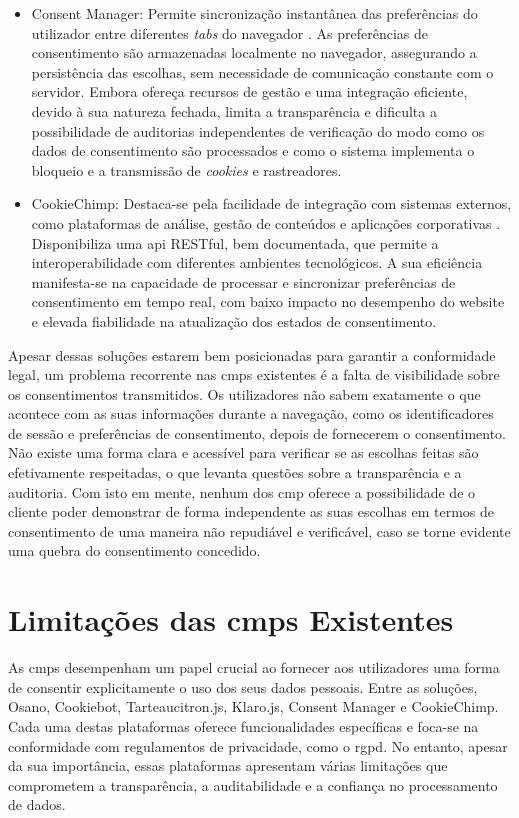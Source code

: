\begin{itemize}
    \item Consent Manager: Permite sincronização instantânea das preferências do utilizador entre diferentes \textit{tabs} do navegador \cite{ConsentManager2024}. As preferências de consentimento são armazenadas localmente no navegador, assegurando a persistência das escolhas, sem necessidade de comunicação constante com o servidor. Embora ofereça recursos de gestão e uma integração eficiente, devido à sua natureza fechada, limita a transparência e dificulta a possibilidade de auditorias independentes de verificação do modo como os dados de consentimento são processados e como o sistema implementa o bloqueio e a transmissão de \textit{cookies} e rastreadores.

    \item CookieChimp: Destaca-se pela facilidade de integração com sistemas externos, como plataformas de análise, gestão de conteúdos e aplicações corporativas \cite{CookieChimp2024}. Disponibiliza uma \acrshort{api} RESTful, bem documentada, que permite a interoperabilidade com diferentes ambientes tecnológicos. A sua eficiência manifesta-se na capacidade de processar e sincronizar preferências de consentimento em tempo real, com baixo impacto no desempenho do website e elevada fiabilidade na atualização dos estados de consentimento.
\end{itemize}

Apesar dessas soluções estarem bem posicionadas para garantir a conformidade legal, um problema recorrente nas \acrshort{cmp}s existentes é a falta de visibilidade sobre os consentimentos transmitidos. Os utilizadores não sabem exatamente o que acontece com as suas informações durante a navegação, como os identificadores de sessão e preferências de consentimento, depois de fornecerem o consentimento. Não existe uma forma clara e acessível para verificar se as escolhas feitas são efetivamente respeitadas, o que levanta questões sobre a transparência e a auditoria. Com isto em mente, nenhum dos \acrshort{cmp} oferece a possibilidade de o cliente poder demonstrar de forma independente as suas escolhas em termos de consentimento de uma maneira não repudiável e verificável, caso se torne evidente uma quebra do consentimento concedido.


\section{Limitações das \acrshort{cmp}s Existentes}

As \acrshort{cmp}s desempenham um papel crucial ao fornecer aos utilizadores uma forma de consentir explicitamente o uso dos seus dados pessoais. Entre as soluções, Osano, Cookiebot, Tarteaucitron.js, Klaro.js, Consent Manager e CookieChimp. Cada uma destas plataformas oferece funcionalidades específicas e foca-se na conformidade com regulamentos de privacidade, como o \acrshort{rgpd}. No entanto, apesar da sua importância, essas plataformas apresentam várias limitações que comprometem a transparência, a auditabilidade e a confiança no processamento de dados.

